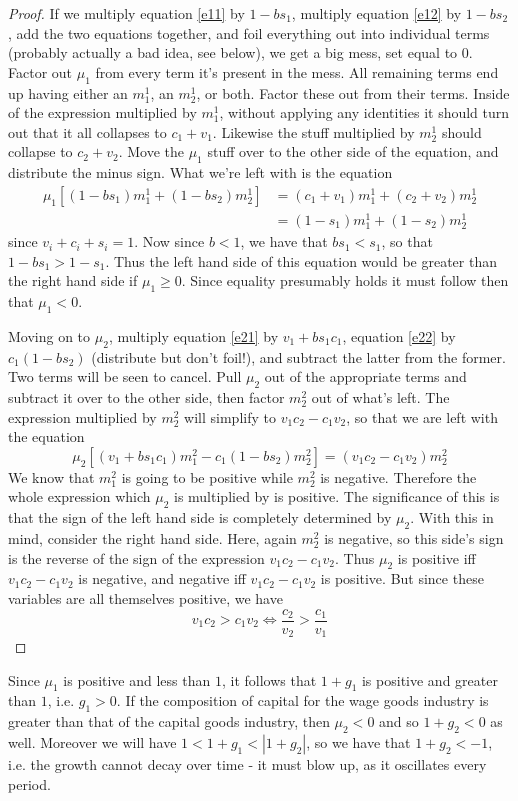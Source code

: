 \documentclass{article}
\theoremstyle{theorem}
\begin{document}
\begin{proof}
	If we multiply equation \ref{e11} by $1-bs_1$, multiply equation \ref{e12} by $1-bs_2$, add the two equations together, and foil everything out into individual terms (probably actually a bad idea, see below), we get a big mess, set equal to $0$. Factor out $\mu_1$ from every term it's present in the mess. All remaining terms end up having either an $m^1_1$, an $m^1_2$, or both. Factor these out from their terms. Inside of the expression multiplied by $m^1_1$, without applying any identities it should turn out that it all collapses to $c_1+v_1$. Likewise the stuff multiplied by $m^1_2$ should collapse to $c_2 + v_2$. Move the $\mu_1$ stuff over to the other side of the equation, and distribute the minus sign. What we're left with is the equation 
\begin{align}
	 \mu_1[(1-bs_1)m^1_1 + (1-bs_2)m^1_2] &= (c_1+v_1)m^1_1 + (c_2+v_2)m^1_2 \\
	 &= (1-s_1)m^1_1 + (1-s_2)m^1_2
\end{align}
since $v_i+c_i+s_i=1$. Now since $b<1$, we have that $bs_1 < s_1$, so that $1-bs_1 > 1-s_1$. Thus the left hand side of this equation would be greater than the right hand side if $\mu_1 \geq 0$. Since equality presumably holds it must follow then that $\mu_1 < 0$. \par 
Moving on to $\mu_2$, multiply equation \ref{e21} by $v_1 + bs_1c_1$, equation \ref{e22} by $c_1(1-bs_2)$ (distribute but don't foil!), and subtract the latter from the former. Two terms will be seen to cancel. Pull $\mu_2$ out of the appropriate terms and subtract it over to the other side, then factor $m^2_2$ out of what's left. The expression multiplied by $m^2_2$ will simplify to $v_1c_2 - c_1v_2$, so that we are left with the equation
\[ \mu_2[(v_1+bs_1c_1)m^2_1-c_1(1-bs_2)m^2_2] = (v_1c_2 - c_1v_2)m^2_2 \]
We know that $m^2_1$ is going to be positive while $m^2_2$ is negative. Therefore the whole expression which $\mu_2$ is multiplied by is positive. The significance of this is that the sign of the left hand side is completely determined by $\mu_2$. With this in mind, consider the right hand side. Here, again $m^2_2$ is negative, so this side's sign is the reverse of the sign of the expression $v_1c_2 - c_1v_2$. Thus $\mu_2$ is positive iff $v_1c_2 - c_1v_2$ is negative, and negative iff $v_1c_2 - c_1v_2$ is positive. But since these variables are all themselves positive, we have
\[ v_1c_2 > c_1v_2 \iff \frac{c_2}{v_2} > \frac{c_1}{v_1}  \]
\end{proof}
Since $\mu_1$ is positive and less than $1$, it follows that $1+g_1$ is positive and greater than $1$, i.e. $g_1 > 0$. If the composition of capital for the wage goods industry is greater than that of the capital goods industry, then $\mu_2 < 0$ and so $1+g_2 < 0$ as well. Moreover we will have $1 < 1+g_1 < |1+g_2|$, so we have that $1+g_2 < -1$, i.e. the growth cannot decay over time - it must blow up, as it oscillates every period. \par 
\end{document}
